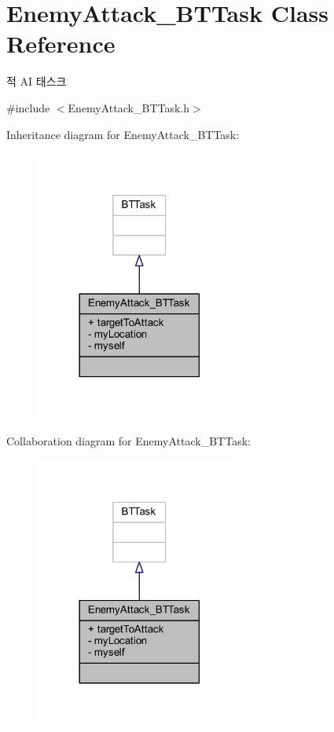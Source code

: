 \hypertarget{class_enemy_attack___b_t_task}{}\section{Enemy\+Attack\+\_\+\+B\+T\+Task Class Reference}
\label{class_enemy_attack___b_t_task}


적 AI 태스크  




{\ttfamily \#include $<$Enemy\+Attack\+\_\+\+B\+T\+Task.\+h$>$}



Inheritance diagram for Enemy\+Attack\+\_\+\+B\+T\+Task\+:
\nopagebreak
\begin{figure}[H]
\begin{center}
\leavevmode
\includegraphics[width=194pt]{class_enemy_attack___b_t_task__inherit__graph}
\end{center}
\end{figure}


Collaboration diagram for Enemy\+Attack\+\_\+\+B\+T\+Task\+:
\nopagebreak
\begin{figure}[H]
\begin{center}
\leavevmode
\includegraphics[width=194pt]{class_enemy_attack___b_t_task__coll__graph}
\end{center}
\end{figure}
